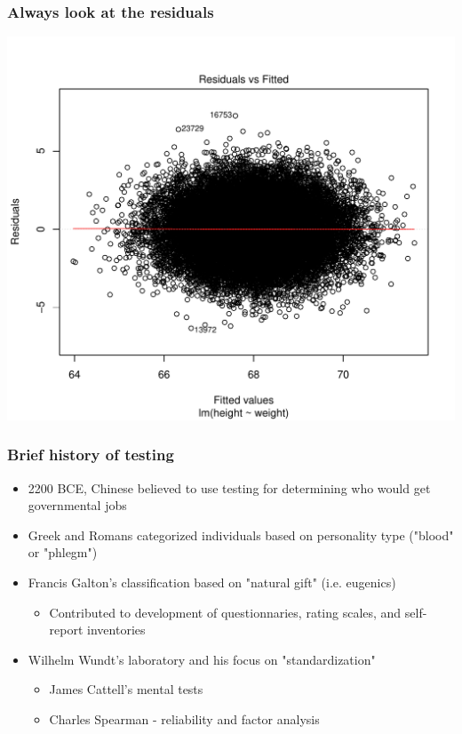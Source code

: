\documentclass[dvipsnames]{beamer}\usepackage[]{graphicx}\usepackage[]{color}
\makeatletter
\def\maxwidth{ %
  \ifdim\Gin@nat@width>\linewidth
    \linewidth
  \else
    \Gin@nat@width
  \fi
}
\newenvironment{knitrout}{}{} %
\makeatother
\begin{document}
\begin{frame}
\frametitle{Always look at the residuals}
\begin{knitrout}
\color{fgcolor}

{\centering \includegraphics[width=\maxwidth]{figure/unnamed-chunk-5-1} 

}



\end{knitrout}
\end{frame}

\begin{frame}
\frametitle{Brief history of testing}
\begin{itemize}
\item 2200 BCE, Chinese believed to use testing for determining who would get governmental jobs
\item Greek and Romans categorized individuals based on personality type ("blood" or "phlegm")
\item Francis Galton's classification based on "natural gift" (i.e. eugenics)
\begin{itemize}
\item Contributed to development of questionnaries, rating scales, and self-report inventories
\end{itemize}
\item Wilhelm Wundt's laboratory and his focus on "standardization"
\begin{itemize}
\item James Cattell's mental tests
\item Charles Spearman - reliability and factor analysis
\end{itemize}
\end{itemize}
\end{frame}
\end{document}
